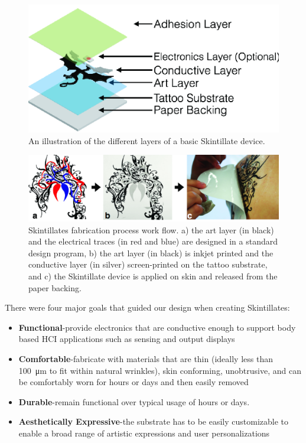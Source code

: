 \documentclass{sigchi}
\begin{document}
\begin{figure}[h]
\centering
\includegraphics[width=0.9\columnwidth]{figures/Figure4}
\caption{An illustration of the different layers of a basic Skintillate device.}
\vspace{-8pt}
\label{fig:layers}
\end{figure}

\begin{figure} [!ht]
\centering
\includegraphics[width=1.0\textwidth]{figures/Figure3}
\caption{Skintillates fabrication process work flow. a) the art layer (in black) and the electrical traces (in red and blue) are designed in a standard design program, b) the art layer (in black) is inkjet printed and the conductive layer (in silver) screen-printed on the tattoo substrate, and c) the Skintillate device is applied on skin and released from  the paper backing.}
\vspace{-8pt}
\label{fig:applicationprocess}
\end{figure}

 There were four major goals that guided our design when creating Skintillates:

\begin{itemize}
  \item \textbf{Functional}-provide electronics that are conductive enough to support body based HCI applications such as sensing and output displays
  \item \textbf{Comfortable}-fabricate with materials that are thin (ideally less than 100\SI{}{\micro\metre} to fit within natural wrinkles), skin conforming, unobtrusive, and can be comfortably worn for hours or days and then easily removed
  \item \textbf{Durable}-remain functional over typical usage of hours or days. 
  \item \textbf{Aesthetically Expressive}-the substrate has to be easily customizable to enable a broad range of  artistic expressions and user personalizations 
\end{itemize}
\end{document}
